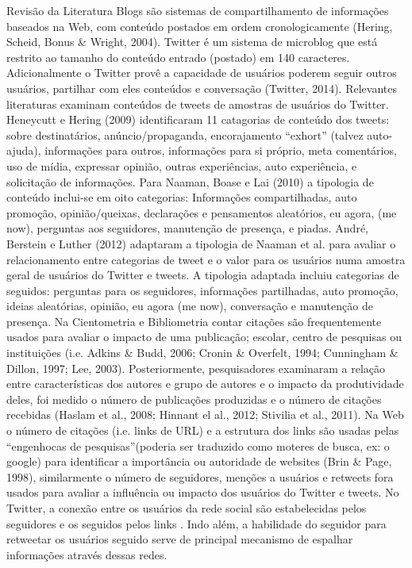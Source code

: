Revisão da Literatura
Blogs são sistemas de compartilhamento de informações baseados na Web, com conteúdo postados  em ordem cronologicamente (Hering, Scheid, Bonus \& Wright, 2004).
Twitter é um sistema de microblog que está restrito ao tamanho do conteúdo entrado (postado) em 140 caracteres. Adicionalmente o Twitter  provê a capacidade de usuários poderem seguir outros usuários, partilhar com eles conteúdos e conversação (Twitter, 2014).
Relevantes literaturas examinam conteúdos de tweets de amostras de usuários do Twitter. Heneycutt e Hering (2009) identificaram 11 catagorias de conteúdo dos tweets: sobre destinatários, anúncio/propaganda, encorajamento “exhort” (talvez auto-ajuda), informações para outros, informações para si próprio, meta comentários, uso de mídia, expressar opinião, outras experiências, auto experiência, e solicitação de informações. 
Para Naaman, Boase e Lai (2010) a tipologia de conteúdo inclui-se em oito categorias: Informações compartilhadas, auto promoção, opinião/queixas, declarações e pensamentos aleatórios, eu agora, (me now), perguntas aos seguidores, manutenção de presença, e piadas. 
André, Berstein e Luther (2012) adaptaram a tipologia de Naaman et al. para avaliar o relacionamento entre categorias de tweet e o valor para os usuários numa amostra geral de usuários do Twitter e tweets. A tipologia adaptada incluiu categorias de seguidos: perguntas para os seguidores, informações partilhadas, auto promoção, ideias aleatórias, opinião, eu agora (me now), conversação e manutenção de presença.
Na Cientometria e Bibliometria contar citações são frequentemente usados para avaliar o impacto de uma publicação; escolar, centro de pesquisas ou instituições (i.e. Adkins \& Budd, 2006; Cronin \& Overfelt, 1994; Cunningham \& Dillon, 1997; Lee, 2003). Posteriormente, pesquisadores examinaram a relação entre características dos autores e grupo de autores e o impacto da produtividade deles, foi medido o número de publicações produzidas e o número de citações recebidas (Haslam et al., 2008;  Hinnant el al., 2012; Stivilia et al., 2011).
Na Web o número de citações (i.e. links de URL) e a estrutura dos links são usadas pelas “engenhocas de pesquisas”(poderia ser traduzido como moteres de busca, ex: o google) para identificar a importância ou autoridade de websites (Brin \& Page, 1998), similarmente o número de seguidores, menções a usuários e retweets fora usados para avaliar a influência ou impacto dos usuários do Twitter e tweets. 
No Twitter, a conexão entre os usuários da rede social são estabelecidas pelos seguidores e os seguidos pelos links . Indo além, a habilidade do seguidor para retweetar os usuários seguido serve de principal mecanismo de espalhar informações através dessas redes. 
